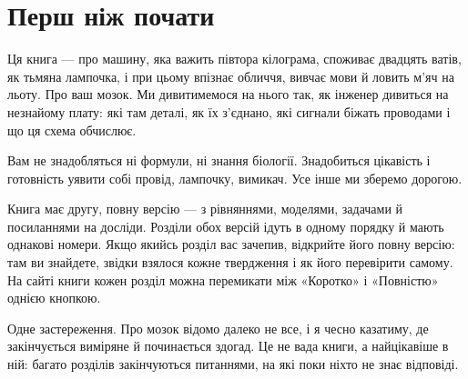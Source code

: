 \chapter*{Перш ніж почати}

Ця книга --- про машину, яка важить півтора кілограма, споживає двадцять ватів, як тьмяна лампочка, і при цьому впізнає обличчя, вивчає мови й ловить м'яч на льоту. Про ваш мозок. Ми дивитимемося на нього так, як інженер дивиться на незнайому плату: які там деталі, як їх з'єднано, які сигнали біжать проводами і що ця схема обчислює.

Вам не знадобляться ні формули, ні знання біології. Знадобиться цікавість і готовність уявити собі провід, лампочку, вимикач. Усе інше ми зберемо дорогою.

Книга має другу, повну версію --- з рівняннями, моделями, задачами й посиланнями на досліди. Розділи обох версій ідуть в одному порядку й мають однакові номери. Якщо якийсь розділ вас зачепив, відкрийте його повну версію: там ви знайдете, звідки взялося кожне твердження і як його перевірити самому. На сайті книги кожен розділ можна перемикати між «Коротко» і «Повністю» однією кнопкою.

Одне застереження. Про мозок відомо далеко не все, і я чесно казатиму, де закінчується виміряне й починається здогад. Це не вада книги, а найцікавіше в ній: багато розділів закінчуються питаннями, на які поки ніхто не знає відповіді.
